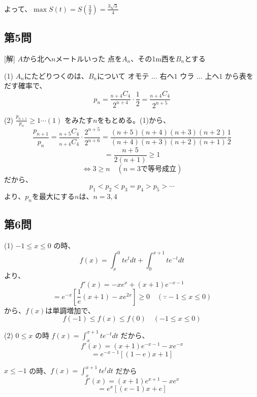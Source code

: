 \documentclass[../main.tex]{subfiles}
\begin{document}
よって、$\max S(t) = S\left(\frac{3}{2}\right) = \frac{3\sqrt{3}}{4}$

\subsection*{第5問}
[解] $A$から北へ$n$メートルいった
点を$A_n$、その1m西を$B_n$とする

\begin{center}
\end{center}

(1) $A_n$にたどりつくのは、$B_n$について
オモテ $\dots$ 右へ$1$
ウラ $\dots$ 上へ$1$
から表をだす確率で、
$$ p_n = \frac{{}_{n+4}C_4}{2^{n+4}} \cdot \frac{1}{2} = \frac{{}_{n+4}C_4}{2^{n+5}} $$

(2) $\frac{p_{n+1}}{p_n} \ge 1 \cdots (1)$ をみたす$n$をもとめる。(1)から、
$$ \frac{p_{n+1}}{p_n} = \frac{{}_{n+5}C_4}{{}_{n+4}C_4} \cdot \frac{2^{n+5}}{2^{n+6}} = \frac{(n+5)(n+4)(n+3)(n+2)}{(n+4)(n+3)(n+2)(n+1)} \frac{1}{2} $$
$$ = \frac{n+5}{2(n+1)} \ge 1 $$
$$ \iff 3 \ge n \quad (n=3\text{で等号成立}) $$
だから、
$$ p_1 < p_2 < p_3 = p_4 > p_5 > \cdots $$
より、$p_n$を最大にする$n$は、$n=3, 4$

\subsection*{第6問}
(1) $-1 \le x \le 0$ の時、
$$ f(x) = \int_x^0 t e^t dt + \int_0^{x+1} t e^{-t} dt $$
より、
$$ f'(x) = -x e^x + (x+1) e^{-x-1} $$
$$ = e^{-x} \left[ \frac{1}{e}(x+1) - x e^{2x} \right] \ge 0 \quad (\because -1 \le x \le 0) $$
から、$f(x)$は単調増加で、
$$ f(-1) \le f(x) \le f(0) \quad (-1 \le x \le 0) $$

(2) $0 \le x$ の時 $f(x) = \int_x^{x+1} t e^{-t} dt$ だから、
$$ f'(x) = (x+1) e^{-x-1} - x e^{-x} $$
$$ = e^{-x-1} \left[ (1-e)x + 1 \right] $$

$x \le -1$ の時、$f(x) = \int_x^{x+1} t e^t dt$ だから
$$ f'(x) = (x+1) e^{x+1} - x e^x $$
$$ = e^x \left[ (e-1)x + e \right] $$
\end{document}
